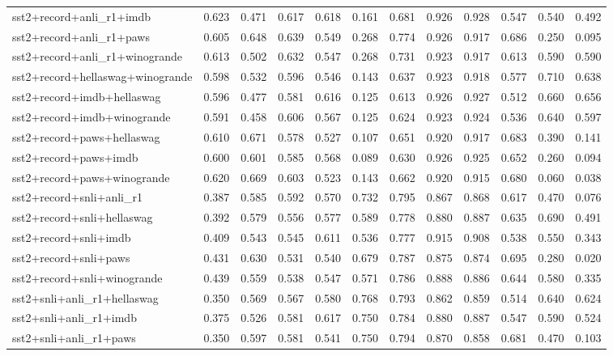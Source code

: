 \begin{table}[t]
\begin{tabular}{lrrrrrrrrrrr}
    sst2+record+anli\_r1+imdb & 0.623 & 0.471 & 0.617 & 0.618 & 0.161 & 0.681 & 0.926 & 0.928 & 0.547 & 0.540 & 0.492 \\
    sst2+record+anli\_r1+paws & 0.605 & 0.648 & 0.639 & 0.549 & 0.268 & 0.774 & 0.926 & 0.917 & 0.686 & 0.250 & 0.095 \\
    sst2+record+anli\_r1+winogrande & 0.613 & 0.502 & 0.632 & 0.547 & 0.268 & 0.731 & 0.923 & 0.917 & 0.613 & 0.590 & 0.590 \\
    sst2+record+hellaswag+winogrande & 0.598 & 0.532 & 0.596 & 0.546 & 0.143 & 0.637 & 0.923 & 0.918 & 0.577 & 0.710 & 0.638 \\
    sst2+record+imdb+hellaswag & 0.596 & 0.477 & 0.581 & 0.616 & 0.125 & 0.613 & 0.926 & 0.927 & 0.512 & 0.660 & 0.656 \\
    sst2+record+imdb+winogrande & 0.591 & 0.458 & 0.606 & 0.567 & 0.125 & 0.624 & 0.923 & 0.924 & 0.536 & 0.640 & 0.597 \\
    sst2+record+paws+hellaswag & 0.610 & 0.671 & 0.578 & 0.527 & 0.107 & 0.651 & 0.920 & 0.917 & 0.683 & 0.390 & 0.141 \\
    sst2+record+paws+imdb & 0.600 & 0.601 & 0.585 & 0.568 & 0.089 & 0.630 & 0.926 & 0.925 & 0.652 & 0.260 & 0.094 \\
    sst2+record+paws+winogrande & 0.620 & 0.669 & 0.603 & 0.523 & 0.143 & 0.662 & 0.920 & 0.915 & 0.680 & 0.060 & 0.038 \\
    sst2+record+snli+anli\_r1 & 0.387 & 0.585 & 0.592 & 0.570 & 0.732 & 0.795 & 0.867 & 0.868 & 0.617 & 0.470 & 0.076 \\
    sst2+record+snli+hellaswag & 0.392 & 0.579 & 0.556 & 0.577 & 0.589 & 0.778 & 0.880 & 0.887 & 0.635 & 0.690 & 0.491 \\
    sst2+record+snli+imdb & 0.409 & 0.543 & 0.545 & 0.611 & 0.536 & 0.777 & 0.915 & 0.908 & 0.538 & 0.550 & 0.343 \\
    sst2+record+snli+paws & 0.431 & 0.630 & 0.531 & 0.540 & 0.679 & 0.787 & 0.875 & 0.874 & 0.695 & 0.280 & 0.020 \\
    sst2+record+snli+winogrande & 0.439 & 0.559 & 0.538 & 0.547 & 0.571 & 0.786 & 0.888 & 0.886 & 0.644 & 0.580 & 0.335 \\
    sst2+snli+anli\_r1+hellaswag & 0.350 & 0.569 & 0.567 & 0.580 & 0.768 & 0.793 & 0.862 & 0.859 & 0.514 & 0.640 & 0.624 \\
    sst2+snli+anli\_r1+imdb & 0.375 & 0.526 & 0.581 & 0.617 & 0.750 & 0.784 & 0.880 & 0.887 & 0.547 & 0.590 & 0.524 \\
    sst2+snli+anli\_r1+paws & 0.350 & 0.597 & 0.581 & 0.541 & 0.750 & 0.794 & 0.870 & 0.858 & 0.681 & 0.470 & 0.103 \\

\end{tabular}
\end{table}
